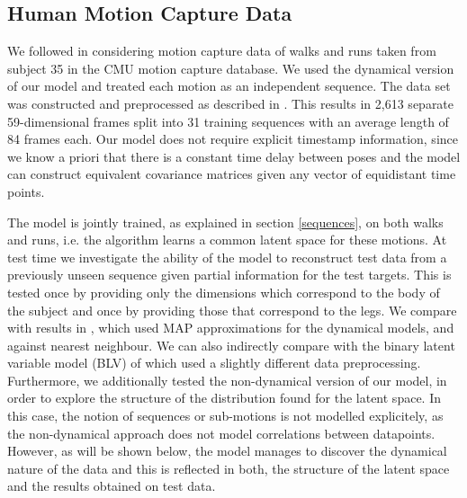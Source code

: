 %

\subsection{Human Motion Capture Data}

We followed \cite{Taylor,gplvmLarger} in considering motion capture
data of walks and runs taken from subject 35 in the CMU motion capture
database. We used the dynamical version of our model and
treated each motion as an independent sequence.  The data
set was constructed and preprocessed as described in
\cite{gplvmLarger}. This results in 2,613 separate 59-dimensional
frames split into 31 training sequences with an average length of 84
frames each. Our model does not require explicit timestamp information, since we
know a priori that there is a constant time delay between poses and the model can construct
equivalent covariance matrices given any vector of equidistant time points.

The model is jointly trained, as explained in section \ref{sequences},
on both walks and runs, i.e. the algorithm learns a common latent
space for these motions. At test time we investigate the ability of
the model to reconstruct test data from a previously unseen sequence
given partial information for the test targets. This is tested once by
providing only the dimensions which correspond to the body of the
subject and once by providing those that correspond to the legs.
%
We compare with results in \cite{gplvmLarger}, which used MAP
approximations for the dynamical models, and against nearest
neighbour. We can also indirectly compare with the binary latent
variable model (BLV) of \cite{Taylor} which used a slightly different
data preprocessing. Furthermore, we additionally tested the non-dynamical
version of our model, in order to explore the structure of the distribution found for the
latent space. In this case, the notion of sequences or sub-motions is not modelled
explicitely, as the non-dynamical approach does not model correlations between
datapoints. However, as will be shown below, the model manages to discover
the dynamical nature of the data and this is reflected in both, the structure of
the latent space and the results obtained on test data.

